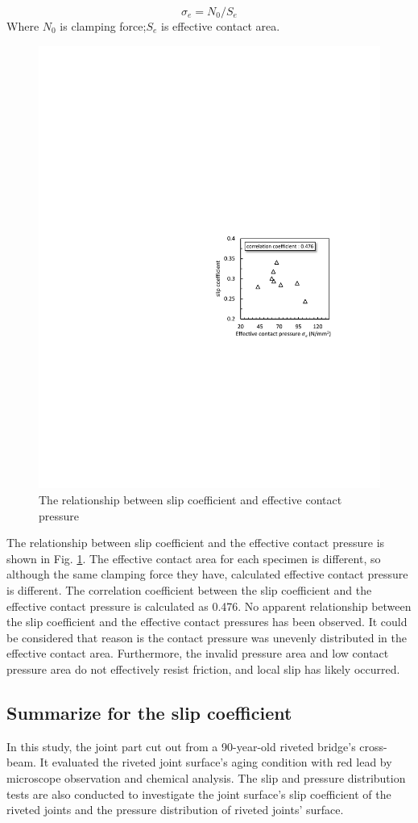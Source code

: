 \begin{equation}
    σ_e=N_0/S_e
\end{equation}
Where $N_0$ is clamping force;$ S_e$ is effective contact area. 

\begin{figure}[htbp]
\centering
\includegraphics[width=0.65\linewidth]{imgs/ch3/fig14.pdf}
\caption{The relationship between slip coefficient and effective contact pressure}
\label{ch3fig14}  
\end{figure}

The relationship between slip coefficient and the effective contact pressure is shown in Fig. \ref{ch3fig14}. The effective contact area for each specimen is different, so although the same clamping force they have, calculated effective contact pressure is different. The correlation coefficient between the slip coefficient and the effective contact pressure is calculated as 0.476. No apparent relationship between the slip coefficient and the effective contact pressures has been observed. It could be considered that reason is the contact pressure was unevenly distributed in the effective contact area. Furthermore, the invalid pressure area and low contact pressure area do not effectively resist friction, and local slip has likely occurred. 


\subsection{Summarize for the slip coefficient}
In this study, the joint part cut out from a 90-year-old riveted bridge's cross-beam. It evaluated the riveted joint surface's aging condition with red lead by microscope observation and chemical analysis. The slip and pressure distribution tests are also conducted to investigate the joint surface's slip coefficient of the riveted joints and the pressure distribution of riveted joints' surface. 

